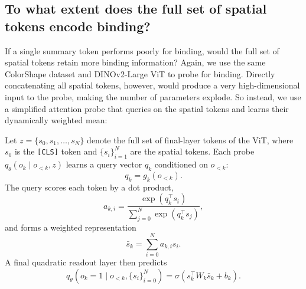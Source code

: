 \documentclass{article}
\theoremstyle{plain}
\theoremstyle{definition}
\theoremstyle{remark}
\begin{document}
\begin{table}[H]
\centering
\caption{\textbf{Probe-estimated binding information $\mathbf{B}_{\mathcal{O}}(Z)$, conditional binding information $\mathbf{B}^{*}_{\mathcal{O}, \mathcal{F}}(Z)$, and their normalized forms $\boldsymbol{\beta}_{\mathcal{O}}(Z)$ and $\boldsymbol{\beta}^{*}_{\mathcal{O}, \mathcal{F}}(Z)$}, recorded on the test set. $H(O)=39.9$ bits and $H(F)=7.0$ bits on this test set. All conditional results use the loss of the quadratic feature probe for the $H(F\mid Z)$ term, varying the object code probe type.}
\label{tab:binding_information}
\end{table}




\subsection{To what extent does the full set of spatial tokens encode binding?}
\label{spatial}

If a single summary token performs poorly for binding, would the full set of spatial tokens retain more binding information? Again, we use the same ColorShape dataset and DINOv2-Large ViT to probe for binding. Directly concatenating all spatial tokens, however, would produce a very high-dimensional input to the probe, making the number of parameters explode. So instead, we use a simplified attention probe that queries on the spatial tokens and learns their dynamically weighted mean:

Let $z=\{s_0, s_1, \dots, s_N\}$ denote the full set of final-layer tokens of the ViT, where $s_0$ is the \texttt{[CLS]} token and $\{s_i\}_{i=1}^N$ are the spatial tokens. Each probe $q_\theta(o_k\mid o_{<k}, z)$ learns a query vector $q_k$ conditioned on $o_{<k}$:
\[
q_k = g_k(o_{<k}).
\]
The query scores each token by a dot product,
\[
a_{k,i}
=
\frac{\exp(q_k^\top s_i)}
{\sum_{j=0}^N \exp(q_k^\top s_j)},
\]
and forms a weighted representation
\[
\bar{s}_k
=
\sum_{i=0}^N a_{k,i}s_i.
\]
A final quadratic readout layer then predicts
\[
q_\theta(o_k=1\mid o_{<k}, \{s_i\}_{i=0}^N)
=
\sigma({s}_k^\top W_k \bar{s}_k+b_k).
\]
\end{document}
